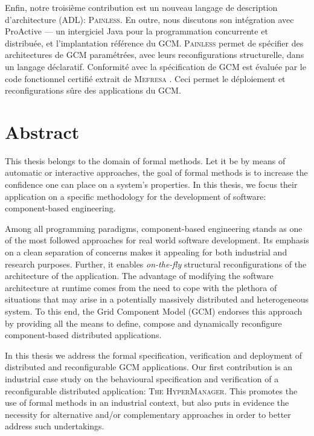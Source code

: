Enfin, notre troisième contribution est un nouveau langage de description d'architecture (ADL): 
\textsc{Painless}. En outre, nous discutons son intégration avec ProActive --- 
un intergiciel Java pour la programmation concurrente et distribuée, 
et l'implantation référence du GCM. 
\textsc{Painless} permet de spécifier des architectures de GCM paramétrées, avec 
leurs reconfigurations structurelle, dans un langage déclaratif. Conformité 
avec la spécification de GCM est évaluée par le code fonctionnel certifié extrait de 
\textsc{Mefresa} . Ceci permet le déploiement et
reconfigurations sûre des applications du GCM.






\chapter*{\centering Abstract}

		This thesis belongs to the domain of formal methods.  
	Let it be by means of automatic or interactive approaches, the goal of formal methods
	is to increase the confidence one can place on a system's properties.
	In this thesis, we focus 
		their application on a specific methodology
	for the development of software: component-based engineering.


		Among all programming paradigms, component-based engineering stands as one
	of the most followed approaches for real world software development. Its emphasis
	on a clean separation of concerns makes it appealing for both industrial
	and research purposes. Further, it enables \textit{on-the-fly} structural 
	reconfigurations of the architecture of the application. The advantage of modifying the software 
	architecture at runtime comes from the need to cope with the plethora of situations 
	that may arise in a potentially massively distributed and heterogeneous system.	
	To this end, the Grid Component Model (GCM) endorses this approach by providing all 
	the means to define, compose and dynamically reconfigure component-based distributed applications.
		
	
		In this thesis we address the formal specification, verification and deployment of
	distributed and reconfigurable GCM applications. Our first contribution is an industrial
	case study on the behavioural specification and verification of a reconfigurable
	distributed application: \textsc{The HyperManager}. 
	This promotes the use of formal methods in an industrial context,
    but also puts in evidence the necessity for alternative and/or complementary approaches 
	in order to better address such undertakings.		
		
